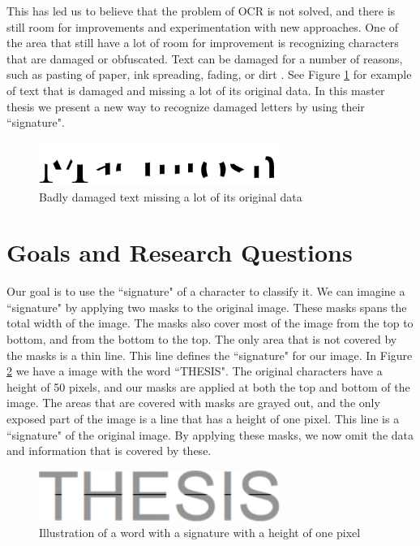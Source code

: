 This has led us to believe that the problem of OCR is not solved, and there is still room for improvements and experimentation with new approaches. One of the area that still have a lot of room for improvement is recognizing characters that are damaged or obfuscated. Text can be damaged for a number of reasons, such as pasting of paper, ink spreading, fading, or dirt \citep{bhardwaj2014imaging}. See Figure \ref{fig:damaged-text} for example of text that is damaged and missing a lot of its original data. In this master thesis we present a new way to recognize damaged letters by using their ``signature".

\begin{figure}[ht]
    \centering
    \includegraphics[width=0.7\textwidth]{fig/chapter1/damaged.png}
    \caption{Badly damaged text missing a lot of its original data}
    \label{fig:damaged-text}
\end{figure}


\section{Goals and Research Questions}
\label{sec:goals_and_research_questions}
Our goal is to use the ``signature" of a character to classify it. We can imagine a ``signature" by applying two masks to the original image. These masks spans the total width of the image. The masks also cover most of the image from the top to bottom, and from the bottom to the top. The only area that is not covered by the masks is a thin line. This line defines the ``signature" for our image. In Figure \ref{fig:thesis-signature} we have a image with the word ``THESIS". The original characters have a height of 50 pixels, and our masks are applied at both the top and bottom of the image. The areas that are covered with masks are grayed out, and the only exposed part of the image is a line that has a height of one pixel. This line is a ``signature" of the original image. By applying these masks, we now omit the data and information that is covered by these.

\begin{figure}[ht]
    \centering
    \includegraphics[width=0.7\textwidth]{fig/chapter1/signature.png}
    \caption{Illustration of a word with a signature with a height of one pixel}
    \label{fig:thesis-signature}
\end{figure}

